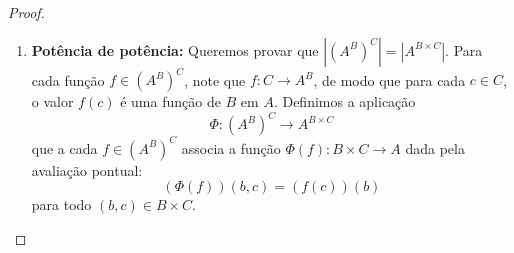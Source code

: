 \begin{proof}
\begin{enumerate}
              Verificamos explicitamente as composições bilaterais entre \(\Phi\) e \(\Psi\):
              \begin{itemize}
                  \item Para toda função \(f \in (A \times B)^C\) e qualquer \(c \in C\), como \(f(c) = (\pi_1(f(c)), \pi_2(f(c)))\), temos:
                        \begin{align*}
                            (\Psi(\Phi(f)))(c) & = (\Psi(\pi_1 \circ f, \; \pi_2 \circ f))(c)  \\
                                               & = ((\pi_1 \circ f)(c), \; (\pi_2 \circ f)(c)) \\
                                               & = (\pi_1(f(c)), \; \pi_2(f(c)))               \\
                                               & = f(c).
                        \end{align*}
                        Como a igualdade é válida para todo \(c \in C\), segue que \(\Psi(\Phi(f)) = f\), isto é, \(\Psi \circ \Phi = \operatorname{id}_{(A \times B)^C}\).
                  \item Para todo par de funções \((g, h) \in A^C \times B^C\), a aplicação \(\Phi\) produz:
                        \[
                            \Phi(\Psi(g, h)) = (\pi_1 \circ \Psi(g, h), \; \pi_2 \circ \Psi(g, h)).
                        \]
                        Avaliando a primeira coordenada em cada \(c \in C\), temos:
                        \[
                            (\pi_1 \circ \Psi(g, h))(c) = \pi_1((\Psi(g, h))(c)) = \pi_1(g(c), h(c)) = g(c),
                        \]
                        o que implica \(\pi_1 \circ \Psi(g, h) = g\). De modo idêntico, para a segunda coordenada:
                        \[
                            (\pi_2 \circ \Psi(g, h))(c) = \pi_2((\Psi(g, h))(c)) = \pi_2(g(c), h(c)) = h(c),
                        \]
                        o que implica \(\pi_2 \circ \Psi(g, h) = h\). Consequentemente:
                        \[
                            \Phi(\Psi(g, h)) = (g, h) \implies \Phi \circ \Psi = \operatorname{id}_{A^C \times B^C}.
                        \]
              \end{itemize}
              Pela \autoref{prop:caracterizacao_bijecao_inversa}, \(\Phi\) é uma bijeção, demonstrando que \(|(A \times B)^C| = |A^C \times B^C|\), ou seja, \((|A| \cdot |B|)^{|C|} = |A|^{|C|} \cdot |B|^{|C|}\).

        \item \textbf{Potência de potência:} Queremos provar que \(|(A^B)^C| = |A^{B \times C}|\).
              Para cada função \(f \in (A^B)^C\), note que \(f: C \to A^B\), de modo que para cada \(c \in C\), o valor \(f(c)\) é uma função de \(B\) em \(A\). Definimos a aplicação
              \[
                  \Phi: (A^B)^C \to A^{B \times C}
              \]
              que a cada \(f \in (A^B)^C\) associa a função \(\Phi(f): B \times C \to A\) dada pela avaliação pontual:
              \[
                  (\Phi(f))(b, c) = (f(c))(b)
              \]
              para todo \((b, c) \in B \times C\).


\end{enumerate}
\end{proof}
